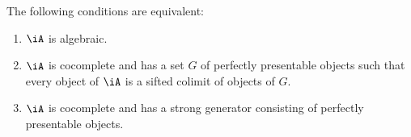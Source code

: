 \documentclass{zett}
\begin{document}
\begin{thm}\label{thm:characterization-of-algebraic-categories}
  The following conditions are equivalent:
  \begin{enumerate}
  \item $\iA$ is algebraic.
  \item $\iA$ is cocomplete and has a set $G$ of perfectly presentable objects such that every object of $\iA$ is a sifted colimit of objects of $G$.
  \item $\iA$ is cocomplete and has a strong generator consisting of perfectly presentable objects.
  \end{enumerate}
\end{thm}
\end{document}
